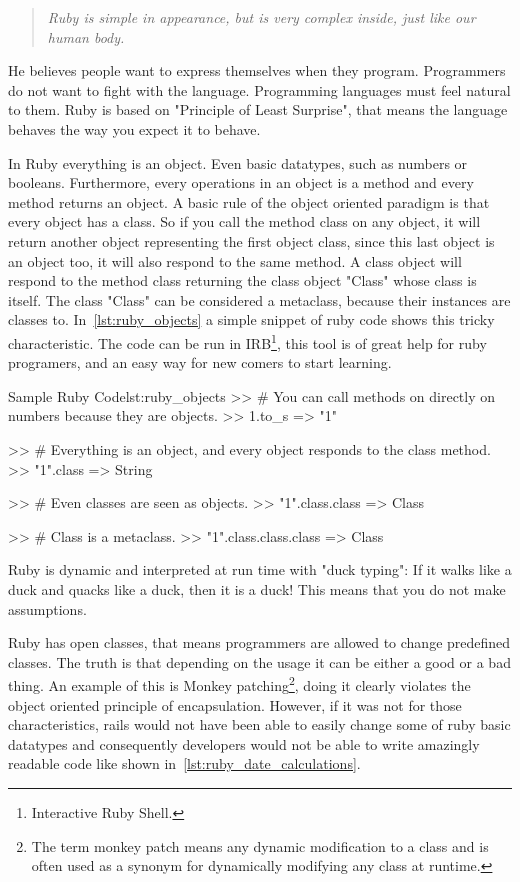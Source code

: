 \begin{quote}\emph{
  Ruby is simple in appearance, but is very complex inside, just like our human body.
}\end{quote}

He believes people want to express themselves when they program. 
Programmers do not want to fight with the language.
Programming languages must feel natural to them.
Ruby is based on "Principle of Least Surprise", 
that means the language behaves the way you expect it to behave.

In Ruby everything is an object. Even basic datatypes, such as numbers or booleans.
Furthermore, every operations in an object is a method and every method returns an object.
A basic rule of the object oriented paradigm is that every object has a class.
So if you call the method class on any object,
it will return another object representing the first object class, 
since this last object is an object too, 
it will also respond to the same method. 
A class object will respond to the method class returning the class object "Class" whose class is itself. 
The class "Class" can be considered a metaclass, because their instances are classes to.
In~\ref{lst:ruby_objects} a simple snippet of ruby code shows this tricky characteristic.
The code can be run in 
\textsf{IRB}\footnote{Interactive Ruby Shell.}, this tool is of great help for ruby programers,
and an easy way for new comers to start learning.

\begin{rubycode}{Sample Ruby Code}{lst:ruby_objects}
  >> # You can call methods on directly on numbers because they are objects.
  >> 1.to_s
  => "1"

  >> # Everything is an object, and every object responds to the class method.
  >> "1".class
  => String

  >> # Even classes are seen as objects.
  >> "1".class.class
  => Class

  >> # Class is a metaclass. 
  >> "1".class.class.class
  => Class
\end{rubycode}

Ruby is dynamic and interpreted at run time with "duck typing": 
If it walks like a duck and quacks like a duck, then it is a duck! This means that you do not make assumptions.

Ruby has open classes, that means programmers are allowed to change predefined classes.
The truth is that depending on the usage it can be either a good or a bad thing. 
An example of this is 
\textsf{Monkey patching}\footnote{
  The term monkey patch means any dynamic modification to a class and 
  is often used as a synonym for dynamically modifying any class at runtime.
},
doing it clearly violates the object oriented principle of encapsulation.
However, if it was not for those characteristics, 
rails would not have been able to easily change some of ruby basic datatypes and 
consequently developers would not be able to write amazingly readable code like shown in~\ref{lst:ruby_date_calculations}.

